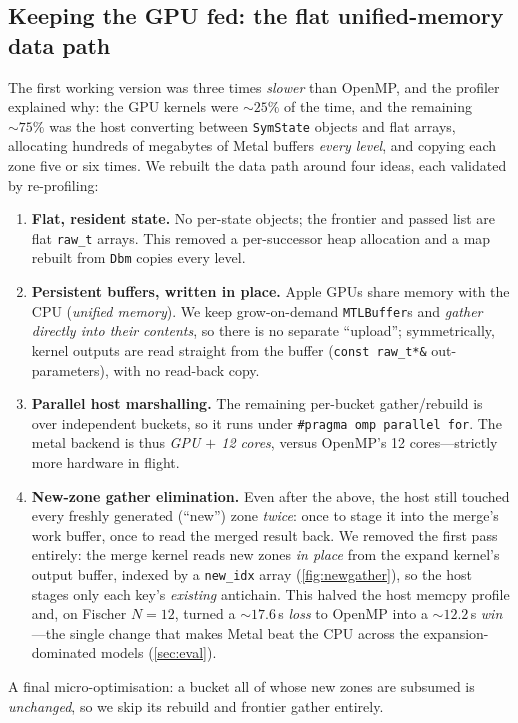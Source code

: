 \documentclass[11pt]{article}
\newcommand{\code}[1]{\texttt{\small #1}}
\begin{document}
\subsection{Keeping the GPU fed: the flat unified-memory data path}\label{sec:feed}
The first working version was three times \emph{slower} than OpenMP, and the profiler explained
why: the GPU kernels were ${\sim}25\%$ of the time, and the remaining ${\sim}75\%$ was the host
converting between \code{SymState} objects and flat arrays, allocating hundreds of megabytes of
Metal buffers \emph{every level}, and copying each zone five or six times. We rebuilt the data path
around four ideas, each validated by re-profiling:
\begin{enumerate}\itemsep2pt
  \item \textbf{Flat, resident state.} No per-state objects; the frontier and passed list are flat
        \code{raw\_t} arrays. This removed a per-successor heap allocation and a map rebuilt from
        \code{Dbm} copies every level.
  \item \textbf{Persistent buffers, written in place.} Apple GPUs share memory with the CPU
        (\emph{unified memory}). We keep grow-on-demand \code{MTLBuffer}s and \emph{gather directly
        into their contents}, so there is no separate ``upload''; symmetrically, kernel outputs are
        read straight from the buffer (\code{const raw\_t*\&} out-parameters), with no read-back
        copy.
  \item \textbf{Parallel host marshalling.} The remaining per-bucket gather/rebuild is over
        independent buckets, so it runs under \code{\#pragma omp parallel for}. The metal backend is
        thus \emph{GPU $+$ 12 cores}, versus OpenMP's 12 cores---strictly more hardware in flight.
  \item \textbf{New-zone gather elimination.} Even after the above, the host still touched every
        freshly generated (``new'') zone \emph{twice}: once to stage it into the merge's work buffer,
        once to read the merged result back. We removed the first pass entirely: the merge kernel
        reads new zones \emph{in place} from the expand kernel's output buffer, indexed by a
        \code{new\_idx} array (\cref{fig:newgather}), so the host stages only each key's \emph{existing} antichain. This
        halved the host memcpy profile and, on Fischer $N{=}12$, turned a ${\sim}17.6$\,s \emph{loss}
        to OpenMP into a ${\sim}12.2$\,s \emph{win}---the single change that makes Metal beat the CPU
        across the expansion-dominated models (\cref{sec:eval}).
\end{enumerate}
A final micro-optimisation: a bucket all of whose new zones are subsumed is \emph{unchanged}, so we
skip its rebuild and frontier gather entirely.
\end{document}

